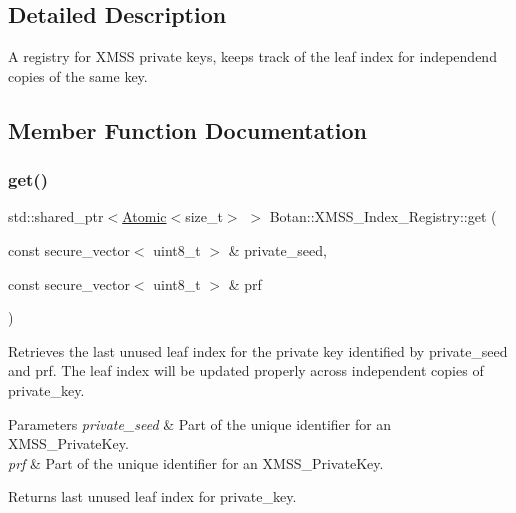 \subsection{Detailed Description}
A registry for X\+M\+SS private keys, keeps track of the leaf index for independend copies of the same key. 

\subsection{Member Function Documentation}
\mbox{\label{class_botan_1_1_x_m_s_s___index___registry_a7b756b7d8a02f2185da9c7c8d4fd8b01}} 
\subsubsection{\texorpdfstring{get()}{get()}}
{\footnotesize\ttfamily std\+::shared\+\_\+ptr$<$\hyperlink{class_botan_1_1_atomic}{Atomic}$<$size\+\_\+t$>$ $>$ Botan\+::\+X\+M\+S\+S\+\_\+\+Index\+\_\+\+Registry\+::get (\begin{DoxyParamCaption}\item[{const secure\+\_\+vector$<$ uint8\+\_\+t $>$ \&}]{private\+\_\+seed,  }\item[{const secure\+\_\+vector$<$ uint8\+\_\+t $>$ \&}]{prf }\end{DoxyParamCaption})}

Retrieves the last unused leaf index for the private key identified by private\+\_\+seed and prf. The leaf index will be updated properly across independent copies of private\+\_\+key.


\begin{DoxyParams}{Parameters}
{\em private\+\_\+seed} & Part of the unique identifier for an X\+M\+S\+S\+\_\+\+Private\+Key. \\
\hline
{\em prf} & Part of the unique identifier for an X\+M\+S\+S\+\_\+\+Private\+Key.\\
\hline
\end{DoxyParams}
\begin{DoxyReturn}{Returns}
last unused leaf index for private\+\_\+key. 
\end{DoxyReturn}
\mbox{\label{class_botan_1_1_x_m_s_s___index___registry_a1f1342ed0b520a67ae8165d3cf0e989e}} 
